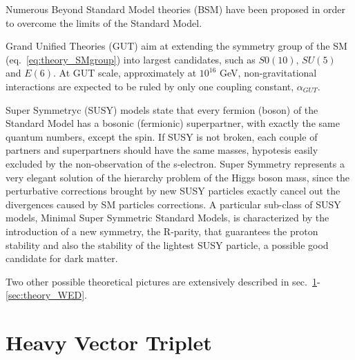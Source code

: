 Numerous Beyond Standard Model theories (BSM) have been proposed in order to overcome the limits of the Standard Model.

Grand Unified Theories (GUT) aim at extending the symmetry group of the SM (eq.~\ref{eq:theory_SMgroup}) into largest candidates, such as $S0(10)$, $SU(5)$ and $E(6)$. At GUT scale, approximately at $10^{16}$ GeV, non-gravitational interactions are expected to be ruled by only one coupling constant, $\alpha_{GUT}$. %

Super Symmetryc (SUSY) models state that every fermion (boson) of the Standard Model has a bosonic (fermionic) superpartner, with exactly the same quantum numbers, except the spin. If SUSY is not broken, each couple of partners and superpartners should have the same masses, hypotesis easily excluded by the non-observation of the s-electron. Super Symmetry represents a very elegant solution of the hierarchy problem of the Higgs boson mass, since the perturbative corrections brought by new SUSY particles exactly cancel out the divergences caused by SM particles corrections. A particular sub-class of SUSY models, Minimal Super Symmetric Standard Models, is characterized by the introduction of a new symmetry, the R-parity, that guarantees the proton stability and also the stability of the lightest SUSY particle, a possible good candidate for dark matter.

Two other possible theoretical pictures are extensively described in sec.~\ref{sec:theory_HVT}-\ref{sec:theory_WED}.


\section{Heavy Vector Triplet}
\label{sec:theory_HVT}

